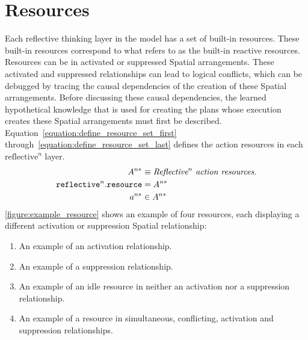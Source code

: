 \section{Resources}

Each reflective thinking layer in the model has a set of built-in
resources.  These built-in resources correspond to what
\cite{minsky:2006} refers to as the built-in reactive resources.
Resources can be in activated or suppressed Spatial arrangements.
These activated and suppressed relationships can lead to logical
conflicts, which can be debugged by tracing the causal dependencies of
the creation of these Spatial arrangements.  Before discussing these
causal dependencies, the learned hypothetical knowledge that is used
for creating the plans whose execution creates these Spatial
arrangements must first be described.
{\mbox{Equation~\ref{equation:define_resource_set_first}}}
{\mbox{through~\ref{equation:define_resource_set_last}}} defines the
action resources in each $\text{reflective}^n$ layer.
\begin{align}
\label{equation:define_resource_set_first}
                                       A^{n*} &\equiv \text{\emph{$\text{Reflective}^n$ action resources.}} \\
\text{\tt{reflective}}^n.\text{\tt{resource}} &= A^{n*} \\
\label{equation:define_resource_set_last}
                                       a^{n*} &\in A^{n*}
\end{align}
{\mbox{\autoref{figure:example_resource}}} shows an example of four
resources, each displaying a different activation or suppression
Spatial relationship:
\begin{enumerate}
\item An example of an activation relationship.
\item An example of a suppression relationship.
\item An example of an idle resource in neither an activation nor a
  suppression relationship.
\item An example of a resource in simultaneous, conflicting,
  activation and suppression relationships.
\end{enumerate}
